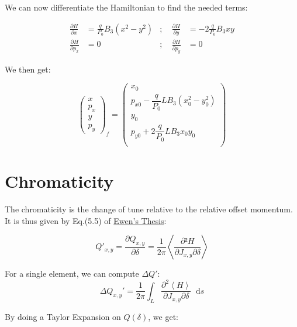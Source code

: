 \documentclass[12pt,a4,]{article}
\numberwithin{equation}{subsection}
\newcommand*\diff{\mathop{}\!\mathrm{d}}
\begin{document}
We can now differentiate the Hamiltonian to find the needed terms:

\begin{equation}
\begin{aligned}
\frac{\partial H}{\partial x} &= \frac{q}{P_0} B_3 (x^2 - y^2) &; \quad \frac{\partial H}{\partial y} &= -2 \frac{q}{P_0} B_3 x y \\
\frac{\partial H}{\partial p_x} &= 0                 &; \quad \frac{\partial H}{\partial p_y} &= 0
\end{aligned}
\end{equation}

We then get:

\begin{equation}
\begin{pmatrix}
x \\ p_x \\ y \\ p_y
\end{pmatrix}_f
=
\begin{pmatrix}
x_0 \\
p_{x0} - \dfrac{q}{P_0} L B_3 (x_0^2 - y_0^2) \\
y_0 \\
p_{y0} + 2\dfrac{q}{P_0} L B_3 x_0 y_0 \\
\end{pmatrix}
\end{equation}

\newpage

\hypertarget{chromaticity}{%
\section{Chromaticity}\label{chromaticity}}

The chromaticity is the change of tune relative to the relative offset
momentum. It is thus given by Eq.(5.5) of
\href{https://cds.cern.ch/record/1951379/files/Thesis-2014-Ewen}{Ewen's
Thesis}:

\[Q'_{x,y} = \frac{\partial Q_{x,y}}{\partial \delta} = \frac{1}{2\pi}\left< \frac{\partial² H}{\partial J_{x,y}\partial \delta}\right>\]

For a single element, we can compute \(ΔQ'\):
\begin{equation}\Delta Q_{x,y}' = \frac{1}{2\pi} \int_L \frac{\partial^2 \left< H \right>}{\partial J_{x,y} \partial \delta} \diff s\label{eq:chroma}\end{equation}

By doing a Taylor Expansion on \(Q(\delta)\), we get:
\end{document}
